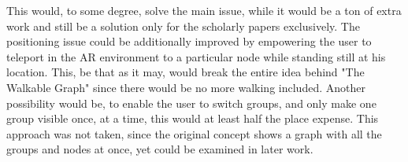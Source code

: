 \documentclass[12pt,a4paper,oneside,american,parskip=half]{article}
\begin{document}
\begin{justify}
\begin{normalsize}
This would, to some degree, solve the main issue, while it would be a ton of extra work and still be a solution only for the scholarly papers exclusively. The positioning issue could be additionally improved by empowering the user to teleport in the AR environment to a particular node while standing still at his location. This, be that as it may, would break the entire idea behind "The Walkable Graph" since there would be no more walking included.
\newline
Another possibility would be, to enable the user to switch groups, and only make one group visible once, at a time, this would at least half the place expense. This approach was not taken, since the original concept shows a graph with all the groups and nodes at once, yet could be examined in later work.
\clearpage


	\end{normalsize}
\end{justify}
\pagestyle{plain}





	\clearpage
	\setcounter{page}{\thesavepage}
	
	
	\clearpage
\end{document}
